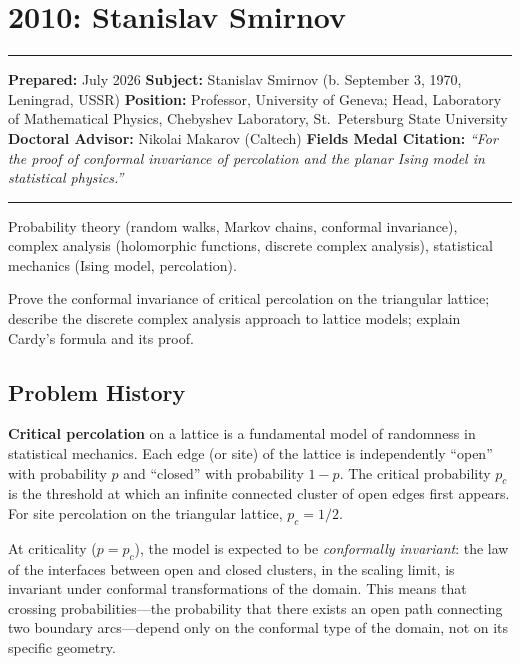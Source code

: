 \chapter{2010: Stanislav Smirnov}\label{ch2010stanislavsmirnov:stanislav-smirnov-fields-medal-2010-a-comprehensive-report-on-his-work-and-impact}

\begin{center}\rule{0.5\linewidth}{0.5pt}\end{center}

\textbf{Prepared:} July 2026 \textbf{Subject:} Stanislav Smirnov (b. September 3, 1970, Leningrad, USSR) \textbf{Position:} Professor, University of Geneva; Head, Laboratory of Mathematical Physics, Chebyshev Laboratory, St.~Petersburg State University \textbf{Doctoral Advisor:} Nikolai Makarov (Caltech) \textbf{Fields Medal Citation:} \emph{``For the proof of conformal invariance of percolation and the planar Ising model in statistical physics.''}

\begin{center}\rule{0.5\linewidth}{0.5pt}\end{center}

\begin{prereqs} Probability theory (random walks, Markov chains, conformal invariance), complex analysis (holomorphic functions, discrete complex analysis), statistical mechanics (Ising model, percolation). \end{prereqs}

\begin{objectives} Prove the conformal invariance of critical percolation on the triangular lattice; describe the discrete complex analysis approach to lattice models; explain Cardy's formula and its proof. \end{objectives}

\section{Problem History}\label{ch2010stanislavsmirnov:problem-history}

\textbf{Critical percolation} on a lattice is a fundamental model of randomness in statistical mechanics. Each edge (or site) of the lattice is independently ``open'' with probability $p$ and ``closed'' with probability $1-p$. The critical probability $p_c$ is the threshold at which an infinite connected cluster of open edges first appears. For site percolation on the triangular lattice, $p_c = 1/2$.

At criticality ($p = p_c$), the model is expected to be \emph{conformally invariant}: the law of the interfaces between open and closed clusters, in the scaling limit, is invariant under conformal transformations of the domain. This means that crossing probabilities---the probability that there exists an open path connecting two boundary arcs---depend only on the conformal type of the domain, not on its specific geometry.


